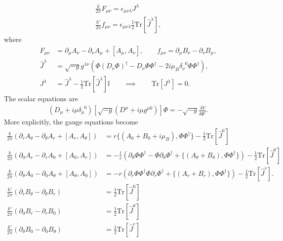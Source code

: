 \begin{align}
    \frac{k}{2 \pi} F_{\mu \nu} = \epsilon_{\mu \nu \lambda} J^{\lambda}\\
    \frac{k'}{2\pi} f_{\mu \nu} = \epsilon_{\mu \nu \lambda} \frac{1}{2} \mathrm{Tr} \left[\hat{J}^{\lambda} \right],
\end{align}
where
\begin{align}
    F_{\mu \nu}&= \partial_{\mu} A_{\nu} - \partial_{\nu}A_{\mu} + [A_{\mu}, A_{\nu}], \qquad f_{\mu \nu} = \partial_{\mu} B_{\nu} - \partial_{\nu} B_{\mu}, \\
    \hat{J}^{\lambda} &= \sqrt{-g} g^{\lambda \nu} \left( \Phi \left( D_{\nu} \Phi\right)^{\dag} - D_{\nu} \Phi \Phi^{\dag}   -2i \mu_B \delta^{\;\; 0}_{\nu} \Phi \Phi^{\dag}  \right), \\
    J^{\lambda} &= \hat{J}^{\lambda} - \frac{1}{2}\mathrm{Tr}\left[\hat{J}^{\lambda} \right]\mathbb{I} \qquad \implies \qquad \mathrm{Tr}\left[J^{\lambda}\right]=0.
\end{align}
The scalar equations are 
\begin{align}
    \left(D_{\mu} + i\mu \delta_{\mu}^{\;\; 0} \right) \left[\sqrt{-g} \left(D^{\mu}+i \mu g^{\mu 0}\right)\right] \Phi = - \sqrt{-g} \frac{\delta V}{\delta \Phi^{\dag}}. \label{eq:U2_scalar_EOM}
\end{align}
More explicitly, the gauge equations become
\begin{align}
    \frac{k}{2\pi} \left(\partial_r A_{\theta} - \partial_{\theta} A_r + [A_r, A_{\theta}]\right) &= r \big\lbrace (A_0 +B_0+ i \mu_B ) , \Phi \Phi^{\dag} \big\rbrace - \frac{1}{2} \mathrm{Tr} \left[ \hat{J}^0 \right] \\
    \frac{k}{2\pi} \left(\partial_0 A_r - \partial_r A_0 + [A_0, A_r]\right) &= -\frac{1}{r} \left(\partial_{\theta} \Phi \Phi^{\dag} -\Phi \partial_{\theta}\Phi^{\dag} + \big\lbrace (A_{\theta} +B_{\theta}), \Phi \Phi^{\dag} \big\rbrace \right) - \frac{1}{2} \mathrm{Tr} \left[ \hat{J}^{\theta} \right]\\
    \frac{k}{2 \pi} \left(\partial_{\theta} A_0 - \partial_{0} A_{\theta} + [A_{\theta}, A_0]\right) &=-r \left(\partial_{r} \Phi \Phi^{\dag} \Phi \partial_r \Phi^{\dag} + \big\lbrace (A_r +B_r), \Phi \Phi^{\dag} \big\rbrace \right) - \frac{1}{2} \mathrm{Tr} \left[ \hat{J}^r \right]. \\
    \frac{k'}{2 \pi} \left( \partial_r B_{\theta}- \partial_{\theta} B_r\right) &= \frac{1}{2} \mathrm{Tr} [\hat{J}^0]\\
    \frac{k'}{2 \pi} \left( \partial_0 B_{r}- \partial_{r} B_0\right) &= \frac{1}{2} \mathrm{Tr} [\hat{J}^{\theta}]\\
    \frac{k'}{2 \pi} \left( \partial_{\theta} B_{0}- \partial_{0} B_{\theta}\right) &= \frac{1}{2} \mathrm{Tr} [\hat{J}^r]\\
\end{align}
